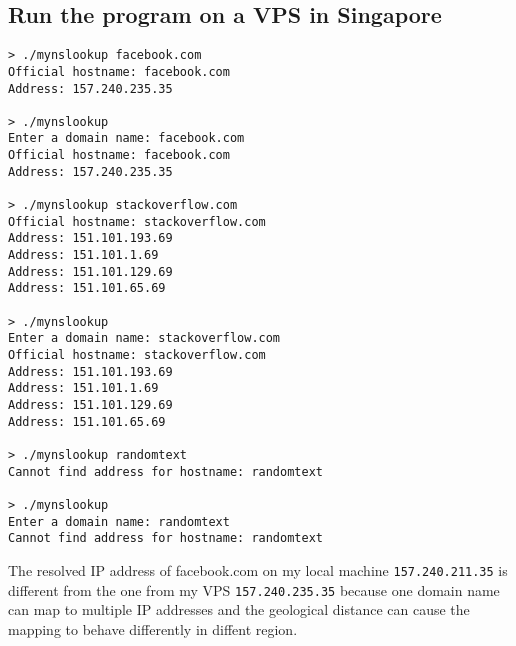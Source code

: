 \documentclass[12pt]{article}
\begin{document}
\subsection{Run the program on a VPS in Singapore}
\begin{verbatim}
> ./mynslookup facebook.com
Official hostname: facebook.com
Address: 157.240.235.35

> ./mynslookup
Enter a domain name: facebook.com
Official hostname: facebook.com
Address: 157.240.235.35

> ./mynslookup stackoverflow.com
Official hostname: stackoverflow.com
Address: 151.101.193.69
Address: 151.101.1.69
Address: 151.101.129.69
Address: 151.101.65.69

> ./mynslookup
Enter a domain name: stackoverflow.com
Official hostname: stackoverflow.com
Address: 151.101.193.69
Address: 151.101.1.69
Address: 151.101.129.69
Address: 151.101.65.69

> ./mynslookup randomtext
Cannot find address for hostname: randomtext

> ./mynslookup
Enter a domain name: randomtext
Cannot find address for hostname: randomtext
\end{verbatim}
The resolved IP address of facebook.com on my local machine \Verb"157.240.211.35" is different from the one from my VPS \Verb"157.240.235.35" because one domain name can map to multiple IP addresses and the geological distance can cause the mapping to behave differently in diffent region.
\clearpage
\end{document}
